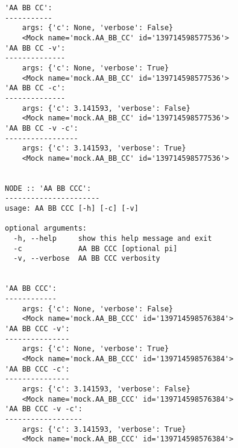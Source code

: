 \documentclass[10pt]{amsart}
\numberwithin{equation}{section}
\begin{document}
\begin{verbatim}
'AA BB CC':
-----------
	args: {'c': None, 'verbose': False}
	<Mock name='mock.AA_BB_CC' id='139714598577536'>
'AA BB CC -v':
--------------
	args: {'c': None, 'verbose': True}
	<Mock name='mock.AA_BB_CC' id='139714598577536'>
'AA BB CC -c':
--------------
	args: {'c': 3.141593, 'verbose': False}
	<Mock name='mock.AA_BB_CC' id='139714598577536'>
'AA BB CC -v -c':
-----------------
	args: {'c': 3.141593, 'verbose': True}
	<Mock name='mock.AA_BB_CC' id='139714598577536'>


NODE :: 'AA BB CCC':
----------------------
usage: AA BB CCC [-h] [-c] [-v]

optional arguments:
  -h, --help     show this help message and exit
  -c             AA BB CCC [optional pi]
  -v, --verbose  AA BB CCC verbosity


'AA BB CCC':
------------
	args: {'c': None, 'verbose': False}
	<Mock name='mock.AA_BB_CCC' id='139714598576384'>
'AA BB CCC -v':
---------------
	args: {'c': None, 'verbose': True}
	<Mock name='mock.AA_BB_CCC' id='139714598576384'>
'AA BB CCC -c':
---------------
	args: {'c': 3.141593, 'verbose': False}
	<Mock name='mock.AA_BB_CCC' id='139714598576384'>
'AA BB CCC -v -c':
------------------
	args: {'c': 3.141593, 'verbose': True}
	<Mock name='mock.AA_BB_CCC' id='139714598576384'>
\end{verbatim}
\end{document}
